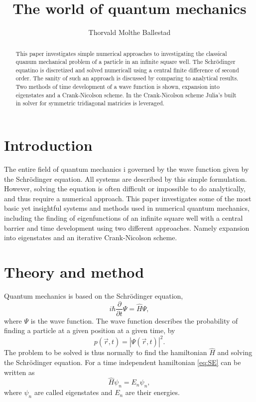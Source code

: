 \documentclass[a4paper, 11pt]{article}
\title{The world of quantum mechanics}
\author{Thorvald Molthe Ballestad}
\newcommand{\del}[2]{\frac{\partial #1}{\partial #2}}  %
\begin{document}
\maketitle

\begin{abstract}
  This paper investigates simple numerical approaches to investigating the classical quanum mechanical problem of a particle in an infinite square well.
  The Schrödinger equatino is discretized and solved numericall using a central finite difference of second order.
  The sanity of such an approach is discussed by comparing to analytical results.
  Two methods of time development of a wave function is shown, expansion into eigenstates and a Crank-Nicolson scheme.
  In the Crank-Nicolson scheme Julia's built in solver for symmetric tridiagonal matricies is leveraged.
\end{abstract}

\section{Introduction}
The entire field of quantum mechanics i governed by the wave function given by the Schrödinger equation.
All systems are described by this simple formulation.
However, solving the equation is often difficult or impossible to do analytically, and thus require a numerical approach.
This paper investigates some of the most basic yet insightful systems and methods used in numerical quantum mechanics, including the finding of eigenfunctions of an infinite square well with a central barrier and time development using two different approaches.
Namely expansion into eigenstates and an iterative Crank-Nicolson scheme.

\section{Theory and method}
Quantum mechanics is based on the Schrödinger equation,
\begin{equation}\label{eq:SE}
i\hbar \del{}{t} \Psi = \hat{H} \Psi,
\end{equation}
where $\Psi$ is the wave function.
The wave function describes the probability of finding a particle at a given position at a given time, by
\begin{equation}
p(\vec{r}, t) = \left|\Psi(\vec{r}, t)\right|^2.
\end{equation}
The problem to be solved is thus normally to find the hamiltonian $\hat{H}$ and solving the Schrödinger equation.
For a time independent hamiltonian \eqref{eq:SE} can be written as \cite{assignment}
\begin{equation}\label{eq:tise}
\hat{H}\psi_n = E_n \psi_n,
\end{equation}
where $\psi_n$ are called eigenstates and $E_n$ are their energies.
\end{document}
